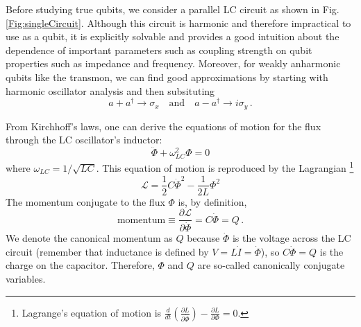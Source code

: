 
Before studying true qubits, we consider a parallel LC circuit as shown in Fig.\,\ref{Fig:singleCircuit}.
Although this circuit is harmonic and therefore impractical to use as a qubit, it is explicitly solvable and provides a good intuition about the dependence of important parameters such as coupling strength on qubit properties such as impedance and frequency.
Moreover, for weakly anharmonic qubits like the transmon, we can find good approximations by starting with harmonic oscillator analysis and then subsituting
\begin{equation*}
  a + a^\dagger \rightarrow \sigma_x
  \quad \textrm{and} \quad
  a - a^\dagger \rightarrow i \sigma_y \, .
\end{equation*}

From Kirchhoff's laws, one can derive the equations of motion for the flux through the LC oscillator's inductor:
\begin{equation*}
  \ddot{\Phi} + \omega_{LC}^2 \Phi = 0
\end{equation*}
where $\omega_{LC}=1/\sqrt{LC}$.
This equation of motion is reproduced by the Lagrangian \footnote{Lagrange's equation of motion is $\frac{d}{dt}\left( \frac{\partial L}{\partial \dot{\Phi}} \right) - \frac{\partial L}{\partial \Phi} = 0$.}
\begin{equation*}
  \mathcal{L} = \frac{1}{2}C\dot{\Phi}^2 - \frac{1}{2L}\Phi^2
\end{equation*}
The momentum conjugate to the flux $\Phi$ is, by definition,
\begin{equation*}
  \text{momentum} \equiv \frac{\partial \mathcal{L}}{\partial \dot{\Phi}} = C\dot{\Phi} = Q \, .
\end{equation*}
We denote the canonical momentum as $Q$ because $\dot{\Phi}$ is the voltage across the LC circuit (remember that inductance is defined by $V = L \dot{I} = \dot{\Phi}$), so $C \dot{\Phi} = Q$ is the charge on the capacitor.
Therefore, $\Phi$ and $Q$ are so-called canonically conjugate variables.

